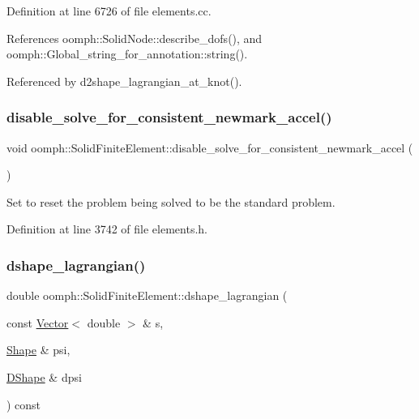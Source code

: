 Definition at line 6726 of file elements.\+cc.



References oomph\+::\+Solid\+Node\+::describe\+\_\+dofs(), and oomph\+::\+Global\+\_\+string\+\_\+for\+\_\+annotation\+::string().



Referenced by d2shape\+\_\+lagrangian\+\_\+at\+\_\+knot().

\mbox{\label{classoomph_1_1SolidFiniteElement_a17063c77624a707896631a69c0fe4316}} 
\subsubsection{\texorpdfstring{disable\+\_\+solve\+\_\+for\+\_\+consistent\+\_\+newmark\+\_\+accel()}{disable\_solve\_for\_consistent\_newmark\_accel()}}
{\footnotesize\ttfamily void oomph\+::\+Solid\+Finite\+Element\+::disable\+\_\+solve\+\_\+for\+\_\+consistent\+\_\+newmark\+\_\+accel (\begin{DoxyParamCaption}{ }\end{DoxyParamCaption})\hspace{0.3cm}{\ttfamily [inline]}}



Set to reset the problem being solved to be the standard problem. 



Definition at line 3742 of file elements.\+h.

\mbox{\label{classoomph_1_1SolidFiniteElement_a4154c1d362b12905f2b5e6cbcfafa9f6}} 
\subsubsection{\texorpdfstring{dshape\+\_\+lagrangian()}{dshape\_lagrangian()}}
{\footnotesize\ttfamily double oomph\+::\+Solid\+Finite\+Element\+::dshape\+\_\+lagrangian (\begin{DoxyParamCaption}\item[{const \hyperlink{classoomph_1_1Vector}{Vector}$<$ double $>$ \&}]{s,  }\item[{\hyperlink{classoomph_1_1Shape}{Shape} \&}]{psi,  }\item[{\hyperlink{classoomph_1_1DShape}{D\+Shape} \&}]{dpsi }\end{DoxyParamCaption}) const}



